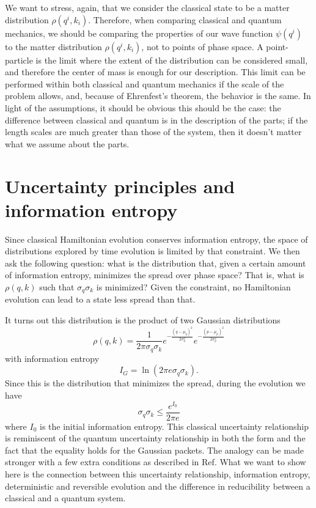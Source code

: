 \documentclass{ws-ijqi}
\begin{document}
We want to stress, again, that we consider the classical state to be a matter distribution $\rho(q^i, k_i)$. Therefore, when comparing classical and quantum mechanics, we should be comparing the properties of our wave function $\psi(q^i)$ to the matter distribution $\rho(q^i, k_i)$, not to points of phase space. A point-particle is the limit where the extent of the distribution can be considered small, and therefore the center of mass is enough for our description. This limit can be performed within both classical and quantum mechanics if the scale of the problem allows, and, because of Ehrenfest's theorem, the behavior is the same. In light of the assumptions, it should be obvious this should be the case: the difference between classical and quantum is in the description of the parts; if the length scales are much greater than those of the system, then it doesn't matter what we assume about the parts.

\section{Uncertainty principles and information entropy}

Since classical Hamiltonian evolution conserves information entropy, the space of distributions explored by time evolution is limited by that constraint. We then ask the following question: what is the distribution that, given a certain amount of information entropy, minimizes the spread over phase space? That is, what is $\rho(q, k)$ such that $\sigma_q\sigma_k$ is minimized? Given the constraint, no Hamiltonian evolution can lead to a state less spread than that.

It turns out this distribution is the product of two Gaussian distributions
\begin{equation}
\rho(q,k) = \frac{1}{2\pi\sigma_q\sigma_k} e^{- \frac{(q - \mu_q)^2}{2 \sigma_q^2}} e^{- \frac{(p - \mu_p)^2}{2 \sigma_p^2}}
\end{equation}
with information entropy
\begin{equation}
I_G = \ln (2 \pi e \sigma_q \sigma_k).
\end{equation}
Since this is the distribution that minimizes the spread, during the evolution we have
\begin{equation}
\sigma_q \sigma_k \leq \frac{e^{I_0}}{2 \pi e}
\end{equation}
where $I_0$ is the initial information entropy. This classical uncertainty relationship is reminiscent of the quantum uncertainty relationship in both the form and the fact that the equality holds for the Gaussian packets. The analogy can be made stronger with a few extra conditions as described in Ref\cite{Carc1}. What we want to show here is the connection between this uncertainty relationship, information entropy, deterministic and reversible evolution and the difference in reducibility between a classical and a quantum system.
\end{document}

